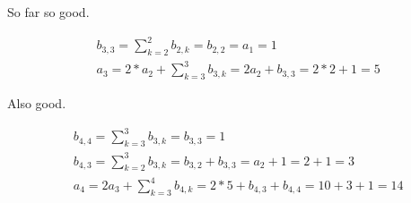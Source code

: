 \documentclass{article}
\begin{document}
So far so good.

\begin{align*}
  &b_{3,3} = \sum_{k=2}^{2} b_{2,k} = b_{2,2} = a_1 = 1 \\
  &a_3 = 2 * a_2 + \sum_{k=3}^{3} b_{3,k} = 2a_2 + b_{3,3} = 2 * 2 + 1 = 5
\end{align*}

Also good.

\begin{align*}
  &b_{4,4} = \sum_{k=3}^{3} b_{3,k} = b_{3,3} = 1 \\
  &b_{4,3} = \sum_{k=2}^{3} b_{3,k} = b_{3,2} + b_{3,3} = a_2 + 1 = 2 + 1 = 3 \\
  &a_4 = 2 a_{3} + \sum_{k=3}^{4} b_{4,k} = 2 * 5 + b_{4,3} + b_{4,4} = 10 + 3 + 1 = 14
\end{align*}
\end{document}
